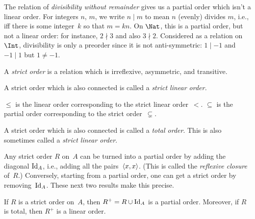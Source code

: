 \documentclass[../../../include/open-logic-section]{subfiles}
\begin{document}
\begin{ex}
The relation of \emph{divisibility without remainder} gives us a
partial order which isn't a linear order. For integers $n$, $m$, we
write $n\mid m$ to mean $n$ (evenly) divides $m$, i.e., iff there is
some integer~$k$ so that $m=kn$. On $\Nat$, this is a partial order, but not a
linear order: for instance, $2\nmid3$ and also $3\nmid2$. Considered
as a relation on $\Int$, divisibility is only a preorder since
it is not anti-symmetric: $1\mid-1$ and $-1\mid1$ but $1\neq-1$.
\end{ex}

\begin{defn}
A \emph{strict order} is a relation which is irreflexive, asymmetric,
and transitive.
\end{defn}

\begin{defn}
A strict order which is also connected is called a
\emph{strict linear order.}
\end{defn}

\begin{ex}
$\le$ is the linear order corresponding to the strict linear
order~$<$. $\subseteq$ is the partial order corresponding to the
strict order~$\subsetneq$.
\end{ex}

\begin{defn}
A strict order which is also connected is called a \emph{total order}.
This is also sometimes called a \emph{strict linear order}. 
\end{defn}

Any strict order $R$ on~$A$ can be turned into a partial order by
adding the diagonal $\mathord{\mathrm{Id}_{A}}$, i.e., adding all the pairs~$\langle x,
x \rangle$.  (This is called the \emph{reflexive closure} of~$R$.)
Conversely, starting from a partial order, one can get a strict order
by removing~$\mathord{\mathrm{Id}_{A}}$. These next two results make this precise.

\begin{prop}
If $R$ is a strict order on~$A$, then $R^+ = R \cup \mathord{\mathrm{Id}_{A}}$ is a
partial order. Moreover, if $R$ is total, then $R^+$ is a linear
order.
\end{prop}
\end{document}
